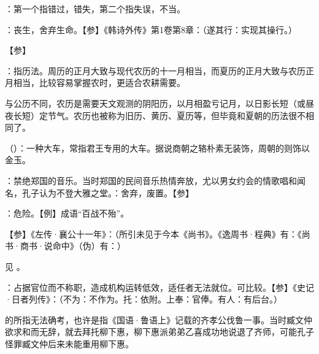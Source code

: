 {
\item {}：第一个指错过，错失，第二个指失误，不当。
}
{}


{
\item {}：丧生，舍弃生命。【参】《韩诗外传》第1卷第8章：（遂其行：实现其操行。）
}
{}


{
【参】
}
{}


{
\item {}：指历法。周历的正月大致与现代农历的十一月相当，而夏历的正月大致与农历正月相当，比较容易掌握农时，更适合农耕需要。

与公历不同，农历是需要天文观测的阴阳历，以月相盈亏记月，以日影长短（或昼夜长短）定节气。农历也被称为旧历、黄历、夏历等，但毕竟和夏朝的历法很不相同了。

\item {}（）：一种大车，常指君王专用的大车。据说商朝之辂朴素无装饰，周朝的则饰以金玉。
\item {}：禁绝郑国的音乐。当时郑国的民间音乐热情奔放，尤以男女约会的情歌唱和闻名，孔子认为不登大雅之堂。：舍弃，废置。【参】
\item {}：危险。【例】成语“百战不殆”。
}
{}


{【参】《左传·襄公十一年》：}（所引未见于今本《尚书》。《逸周书·程典》有：《尚书·商书·说命中》（伪）有：）
{}


{见 。}
{}


{
\item {}：占据官位而不称职，造成机构运转低效，适任者无法就位。可比较。【参】《史记·日者列传》：（不为：不作为。托：依附。上奉：官俸。有人：有后台。）

\item {}的所指无法确考，也许是指《国语·鲁语上》记载的齐孝公伐鲁一事。当时臧文仲欲求和而无辞，就去拜托柳下惠，柳下惠派弟弟乙喜成功地说退了齐师，可能孔子怪罪臧文仲后来未能重用柳下惠。%
}
{}


